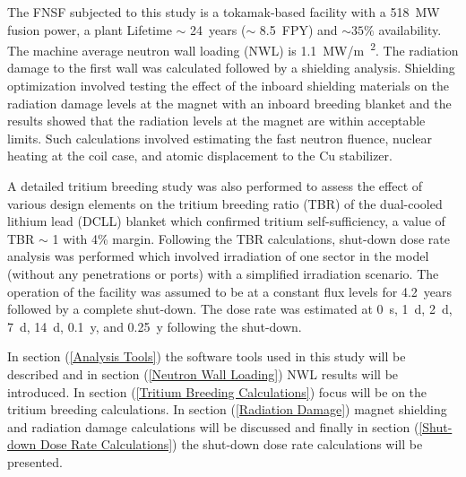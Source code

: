\documentclass[12pt, letterpaper]{elsarticle}
\begin{document}
The FNSF subjected to this study is a tokamak-based facility with a \SI{518}{MW} fusion power, a plant Lifetime $\sim$ \SI{24}{years} ($\sim$ \SI{8.5}{FPY}) and $\sim 35\%$ availability. The machine average neutron wall loading (NWL) is \SI{1.1}{MW/m\textsuperscript{2}}. The radiation damage to the first wall was calculated followed by a shielding analysis. Shielding optimization \cite{ref_2} involved testing the effect of the inboard shielding materials on the radiation damage levels at the magnet with an inboard breeding blanket and the results showed that the radiation levels at the magnet are within acceptable limits. Such calculations involved estimating the fast neutron fluence, nuclear heating at the coil case, and atomic displacement to the Cu stabilizer.\vspace{5mm}

A detailed tritium breeding study was also performed to assess the effect of various design elements on the tritium breeding ratio (TBR) of the dual-cooled lithium lead (DCLL) blanket which confirmed tritium self-sufficiency, a value of TBR $\sim$ 1 with 4\% margin. Following the TBR calculations, shut-down dose rate analysis was performed which involved irradiation of one sector in the model (without any penetrations or ports) with a simplified irradiation scenario. The operation of the facility was assumed to be at a constant flux levels for \SI{4.2}{years} followed by a complete shut-down. The dose rate was estimated at \SI{0}{s}, \SI{1}{d}, \SI{2}{d}, \SI{7}{d}, \SI{14}{d}, \SI{0.1}{y}, and \SI{0.25}{y} following the shut-down.\vspace{5mm}

In section (\ref{Analysis Tools}) the software tools used in this study will be described and in section (\ref{Neutron Wall Loading}) NWL results will be introduced. In section (\ref{Tritium Breeding Calculations}) focus will be on the tritium breeding calculations. In section (\ref{Radiation Damage}) magnet shielding and radiation damage calculations will be discussed and finally in section (\ref{Shut-down Dose Rate Calculations}) the shut-down dose rate calculations will be presented.
\end{document}
